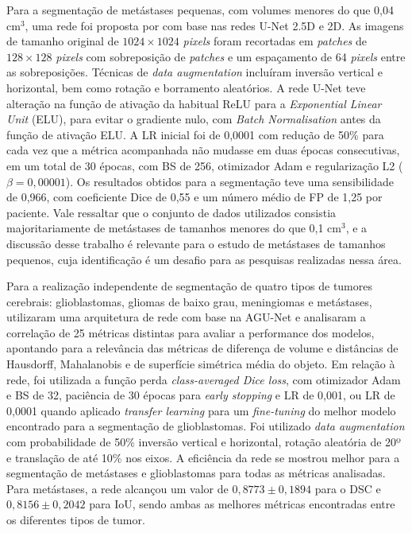 Para a segmentação de metástases pequenas, com volumes menores do que 0,04 cm$^3$, uma rede foi proposta por \cite{Yoo:2022} com base nas redes U-Net 2.5D e 2D. As imagens de tamanho original de $1024 \times 1024$ \textit{pixels} foram recortadas em \textit{patches} de $128 \times 128$ \textit{pixels} com sobreposição de \textit{patches} e um espaçamento de 64 \textit{pixels} entre as sobreposições. Técnicas de \textit{data augmentation} incluíram inversão vertical e horizontal, bem como rotação e borramento aleatórios. A rede U-Net teve alteração na função de ativação da habitual ReLU para a \textit{Exponential Linear Unit} (ELU), para evitar o gradiente nulo, com \textit{Batch Normalisation} antes da função de ativação ELU. A LR inicial foi de 0,0001 com redução de 50\% para cada vez que a métrica acompanhada não mudasse em duas épocas consecutivas, em um total de 30 épocas, com BS de 256, otimizador Adam e regularização L2 ($\beta = 0,00001$). Os resultados obtidos para a segmentação teve uma sensibilidade de 0,966, com coeficiente Dice de 0,55 e um número médio de FP de 1,25 por paciente. Vale ressaltar que o conjunto de dados utilizados consistia majoritariamente de metástases de tamanhos menores do que 0,1 cm$^3$, e a discussão desse trabalho é relevante para o estudo de metástases de tamanhos pequenos, cuja identificação é um desafio para as pesquisas realizadas nessa área.

Para a realização independente de segmentação de quatro tipos de tumores cerebrais: glioblastomas, gliomas de baixo grau, meningiomas e metástases, \cite{Bouget:2022} utilizaram uma arquitetura de rede com base na AGU-Net e analisaram a correlação de 25 métricas distintas para avaliar a performance dos modelos, apontando para a relevância das métricas de diferença de volume e distâncias de Hausdorff, Mahalanobis e de superfície simétrica média do objeto. Em relação à rede, foi utilizada a função perda \textit{class-averaged Dice loss}, com otimizador Adam e BS de 32, paciência de 30 épocas para \textit{early stopping} e LR de 0,001, ou LR de 0,0001 quando aplicado \textit{transfer learning} para um \textit{fine-tuning} do melhor modelo encontrado para a segmentação de glioblastomas. Foi utilizado \textit{data augmentation} com probabilidade de 50\% inversão vertical e horizontal, rotação aleatória de 20º e translação de até 10\% nos eixos. A eficiência da rede se mostrou melhor para a segmentação de metástases e glioblastomas para todas as métricas analisadas. Para metástases, a rede alcançou um valor de $0,8773 \pm 0,1894$ para o DSC e $0,8156 \pm 0,2042$ para IoU, sendo ambas as melhores métricas encontradas entre os diferentes tipos de tumor.

